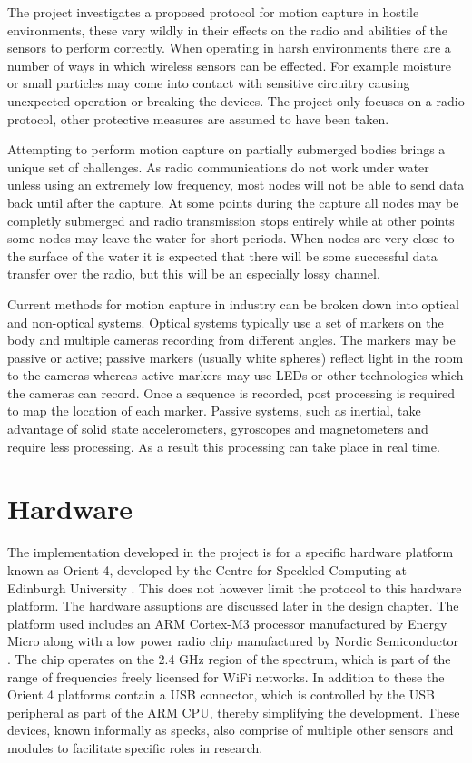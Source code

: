 \documentclass[parskip]{cs4rep}
\begin{document}
The project investigates a proposed protocol for motion capture in hostile environments, these vary wildly in their effects on the radio and abilities of the sensors to perform correctly. When operating in harsh environments there are a number of ways in which wireless sensors can be effected. For example moisture or small particles may come into contact with sensitive circuitry causing unexpected operation or breaking the devices. The project only focuses on a radio protocol, other protective measures are assumed to have been taken.

Attempting to perform motion capture on partially submerged bodies brings a unique set of challenges. As radio communications do not work under water unless using an extremely low frequency, most nodes will not be able to send data back until after the capture. At some points during the capture all nodes may be completly submerged and radio transmission stops entirely while at other points some nodes may leave the water for short periods. When nodes are very close to the surface of the water it is expected that there will be some successful data transfer over the radio, but this will be an especially lossy channel. 

Current methods for motion capture in industry can be broken down into optical and non-optical systems. Optical systems typically use a set of markers on the body and multiple cameras recording from different angles. The markers may be passive or active; passive markers (usually white spheres) reflect light in the room to the cameras whereas active markers may use LEDs or other technologies which the cameras can record. Once a sequence is recorded, post processing is required to map the location of each marker. Passive systems, such as inertial, take advantage of solid state accelerometers, gyroscopes and magnetometers and require less processing. As a result this processing can take place in real time. 

\section{Hardware}

The implementation developed in the project is for a specific hardware platform known as Orient 4, developed by the Centre for Speckled Computing at Edinburgh University \cite{W5}. This does not however limit the protocol to this hardware platform. The hardware assuptions are discussed later in the design chapter. The platform used includes an ARM Cortex-M3 processor manufactured by Energy Micro \cite{W1} along with a low power radio chip manufactured by Nordic Semiconductor \cite{W5}. The chip operates on the 2.4 GHz region of the spectrum, which is part of the range of frequencies freely licensed for WiFi networks. In addition to these the Orient 4 platforms contain a USB connector, which is controlled by the USB peripheral as part of the ARM CPU, thereby simplifying the development. These devices, known informally as specks, also comprise of multiple other sensors and modules to facilitate specific roles in research.
\end{document}
